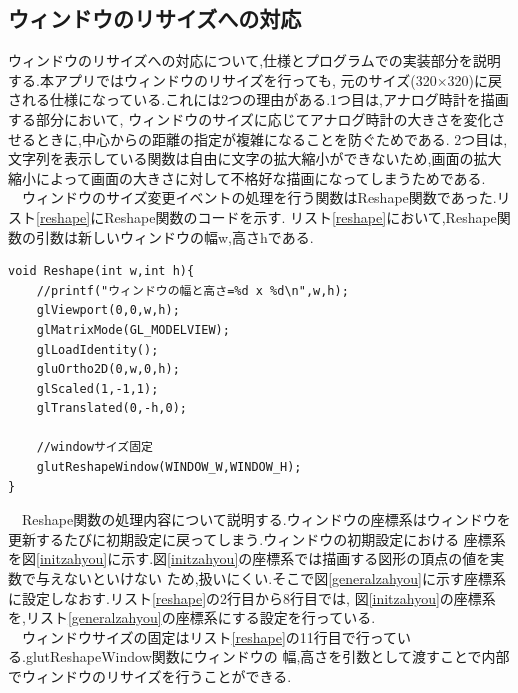 \documentclass[a4j]{jarticle}
\begin{document}
  \subsection{ウィンドウのリサイズへの対応}
  ウィンドウのリサイズへの対応について,仕様とプログラムでの実装部分を説明する.本アプリではウィンドウのリサイズを行っても,
  元のサイズ(320$\times$320)に戻される仕様になっている.これには2つの理由がある.1つ目は,アナログ時計を描画する部分において,
  ウィンドウのサイズに応じてアナログ時計の大きさを変化させるときに,中心からの距離の指定が複雑になることを防ぐためである.
  2つ目は,文字列を表示している関数は自由に文字の拡大縮小ができないため,画面の拡大縮小によって画面の大きさに対して不格好な描画になってしまうためである.\\
  　ウィンドウのサイズ変更イベントの処理を行う関数はReshape関数であった.リスト\ref{reshape}にReshape関数のコードを示す.
  リスト\ref{reshape}において,Reshape関数の引数は新しいウィンドウの幅w,高さhである.
  \begin{lstlisting}[basicstyle=\ttfamily\footnotesize, frame=single,label=reshape,caption=Reshape関数]
void Reshape(int w,int h){
    //printf("ウィンドウの幅と高さ=%d x %d\n",w,h);
    glViewport(0,0,w,h);
    glMatrixMode(GL_MODELVIEW);
    glLoadIdentity();
    gluOrtho2D(0,w,0,h);
    glScaled(1,-1,1);
    glTranslated(0,-h,0);

    //windowサイズ固定 
    glutReshapeWindow(WINDOW_W,WINDOW_H);
}    
      \end{lstlisting} 
      　Reshape関数の処理内容について説明する.ウィンドウの座標系はウィンドウを更新するたびに初期設定に戻ってしまう.ウィンドウの初期設定における
        座標系を図\ref{initzahyou}に示す.図\ref{initzahyou}の座標系では描画する図形の頂点の値を実数で与えないといけない
        ため,扱いにくい.そこで図\ref{generalzahyou}に示す座標系に設定しなおす.リスト\ref{reshape}の2行目から8行目では,
        図\ref{initzahyou}の座標系を,リスト\ref{generalzahyou}の座標系にする設定を行っている.\\
        　ウィンドウサイズの固定はリスト\ref{reshape}の11行目で行っている.glutReshapeWindow関数にウィンドウの
        幅,高さを引数として渡すことで内部でウィンドウのリサイズを行うことができる.
\end{document}
